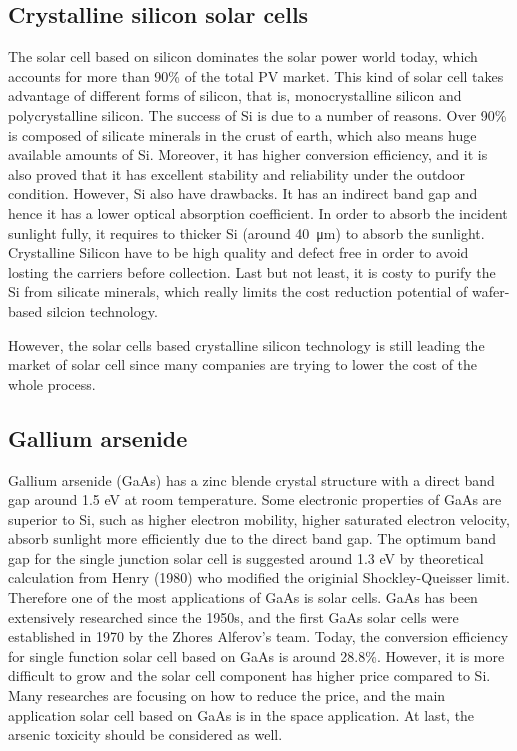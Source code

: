 \documentclass[a4paper, 12pt, titlepage,oneside,drop]{kthesis}
\begin{document}
\subsection{Crystalline silicon solar cells}
The solar cell based on silicon dominates the solar power world today, which accounts for more than 90\% of the total PV market.
This kind of solar cell takes advantage of different forms of silicon, that is, monocrystalline silicon and polycrystalline silicon. 
The success of Si is due to a number of reasons. Over 90\% is composed of silicate minerals in the crust of earth, which also means huge available amounts of Si. Moreover, it has higher conversion efficiency, and it is also proved that 
it has excellent stability and reliability under the outdoor condition. However, Si also have drawbacks. It has an indirect band gap and hence it has a lower optical absorption coefficient. In order to absorb the incident sunlight fully, 
it requires to thicker Si (around \SI{40} {\micro\meter}) to absorb the sunlight. Crystalline Silicon have to be high quality and defect free in order to avoid losting the carriers before collection. Last but not least, it is costy to purify the Si from silicate minerals, which
really limits the cost reduction potential of wafer-based silcion technology. 

However, the solar cells based crystalline silicon technology is still leading the market of solar cell since many companies are trying to lower the cost of the whole process.



\subsection{Gallium arsenide}
Gallium arsenide (GaAs) has a zinc blende crystal structure with a direct band gap around 1.5 eV at room temperature. Some electronic properties of GaAs are superior to Si, such as higher electron 
mobility, higher saturated electron velocity, absorb sunlight more efficiently due to the direct band gap. The optimum band gap for the single junction solar cell is suggested around 1.3 eV by theoretical calculation 
from Henry (1980) who modified the originial Shockley-Queisser limit. Therefore one of the most applications of GaAs is solar cells. GaAs has been extensively researched since the 1950s, and the first GaAs solar cells were established in
1970 by the Zhores Alferov's team. Today, the conversion efficiency for single function solar cell based on GaAs is around 28.8\%. However, it is more difficult to grow and the solar cell component has higher price compared to Si.
Many researches are focusing on how to reduce the price, and the main application solar cell based on GaAs is in the space application. At last, the arsenic toxicity should be considered as well. 
\end{document}
